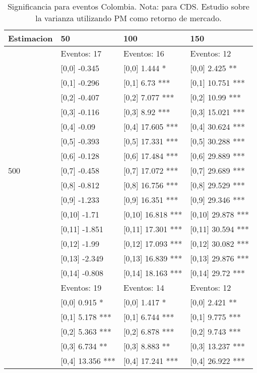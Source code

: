 \begin{table}

\caption{Significancia para eventos Colombia. Nota: para CDS. Estudio sobre la varianza utilizando PM como retorno de mercado.}
\centering
\begin{tabular}[t]{llll}
\toprule
Estimacion & 50 & 100 & 150\\
\midrule
 & Eventos:  17 & Eventos:  16 & Eventos:  12\\
 & {}[0,0] -0.345 & {}[0,0] 1.444 * & {}[0,0] 2.425 **\\
 & {}[0,1] -0.296 & {}[0,1] 6.73 *** & {}[0,1] 10.751 ***\\
 & {}[0,2] -0.407 & {}[0,2] 7.077 *** & {}[0,2] 10.99 ***\\
 & {}[0,3] -0.116 & {}[0,3] 8.92 *** & {}[0,3] 15.021 ***\\
\addlinespace
 & {}[0,4] -0.09 & {}[0,4] 17.605 *** & {}[0,4] 30.624 ***\\
 & {}[0,5] -0.393 & {}[0,5] 17.331 *** & {}[0,5] 30.288 ***\\
 & {}[0,6] -0.128 & {}[0,6] 17.484 *** & {}[0,6] 29.889 ***\\
500 & {}[0,7] -0.458 & {}[0,7] 17.072 *** & {}[0,7] 29.689 ***\\
 & {}[0,8] -0.812 & {}[0,8] 16.756 *** & {}[0,8] 29.529 ***\\
\addlinespace
 & {}[0,9] -1.233 & {}[0,9] 16.351 *** & {}[0,9] 29.346 ***\\
 & {}[0,10] -1.71 & {}[0,10] 16.818 *** & {}[0,10] 29.878 ***\\
 & {}[0,11] -1.851 & {}[0,11] 17.301 *** & {}[0,11] 30.594 ***\\
 & {}[0,12] -1.99 & {}[0,12] 17.093 *** & {}[0,12] 30.082 ***\\
 & {}[0,13] -2.349 & {}[0,13] 16.839 *** & {}[0,13] 29.876 ***\\
\addlinespace
 & {}[0,14] -0.808 & {}[0,14] 18.163 *** & {}[0,14] 29.72 ***\\
 & Eventos:  19 & Eventos:  14 & Eventos:  12\\
 & {}[0,0] 0.915 * & {}[0,0] 1.417 * & {}[0,0] 2.421 **\\
 & {}[0,1] 5.178 *** & {}[0,1] 6.744 *** & {}[0,1] 9.775 ***\\
 & {}[0,2] 5.363 *** & {}[0,2] 6.878 *** & {}[0,2] 9.743 ***\\
\addlinespace
 & {}[0,3] 6.734 ** & {}[0,3] 8.883 ** & {}[0,3] 13.237 ***\\
 & {}[0,4] 13.356 *** & {}[0,4] 17.241 *** & {}[0,4] 26.922 ***\\

\end{tabular}
\end{table}
